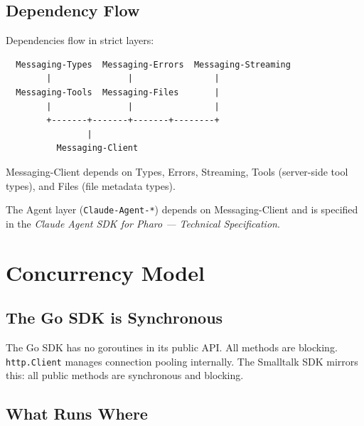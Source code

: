 \documentclass[a4paper,10pt,fleqn]{article}
\newcommand{\pkg}[1]{\texttt{#1}}
\begin{document}
\subsection{Dependency Flow}

Dependencies flow in strict layers:

\begin{verbatim}
  Messaging-Types  Messaging-Errors  Messaging-Streaming
        |               |                |
  Messaging-Tools  Messaging-Files       |
        |               |                |
        +-------+-------+-------+--------+
                |
          Messaging-Client
\end{verbatim}

\noindent Messaging-Client depends on Types, Errors, Streaming, Tools
(server-side tool types), and Files (file metadata types).

The Agent layer (\pkg{Claude-Agent-*}) depends on Messaging-Client and
is specified in the \emph{Claude Agent SDK for Pharo --- Technical
Specification}.

\section{Concurrency Model}

\subsection{The Go SDK is Synchronous}

The Go SDK has no goroutines in its public API.  All methods are blocking.
\texttt{http.Client} manages connection pooling internally.  The Smalltalk
SDK mirrors this: all public methods are synchronous and blocking.

\subsection{What Runs Where}
\end{document}
